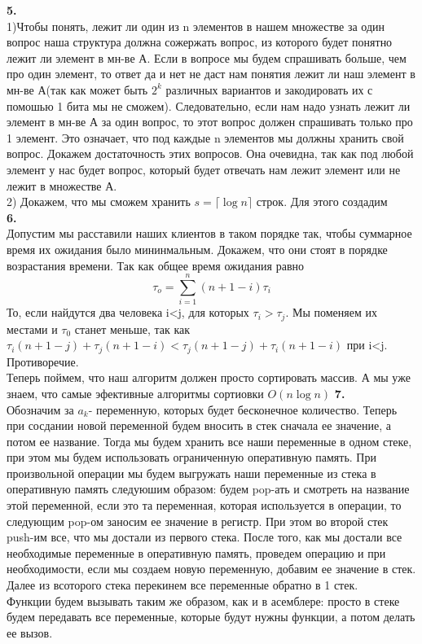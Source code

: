 \documentclass[a4paper,12pt]{article}
\begin{document}
\textbf{5.}\\
1)Чтобы понять, лежит ли один из n элементов в нашем множестве за один вопрос наша структура должна сожержать вопрос, из которого будет понятно лежит ли элемент в мн-ве А.  Если в вопросе мы будем спрашивать больше, чем про один элемент, то ответ да и нет не даст нам понятия лежит ли наш элемент в мн-ве А(так как может быть $2^k$ различных вариантов и закодировать их с помошью 1 бита мы не сможем). Следовательно, если нам надо узнать лежит ли элемент в мн-ве А за один вопрос, то этот вопрос должен спрашивать только про 1 элемент. Это означает, что под каждые n элементов мы должны хранить свой вопрос. Докажем достаточность этих вопросов. Она очевидна, так как под любой элемент у нас будет вопрос, который будет отвечать нам лежит элемент или не лежит в множестве А.\\
2) Докажем, что мы сможем хранить $s=\lceil \log n \rceil $ строк. Для этого создадим \\
\textbf{6.}\\
Допустим мы расставили наших клиентов в таком порядке так, чтобы суммарное время их ожидания было мининмальным. Докажем, что они стоят в порядке возрастания времени. Так как общее время ожидания равно
\[\tau_o=\sum_{i=1}^n (n+1-i)\tau_i\]
То, если найдутся два человека i<j, для которых $\tau_i>\tau_j$. Мы поменяем их местами и $\tau_0$ станет меньше, так как $\tau_i(n+1-j)+\tau_j(n+1-i)<\tau_j(n+1-j)+\tau_i(n+1-i)$
при i<j. Противоречие.\\
Теперь поймем, что наш алгоритм должен просто сортировать массив. А мы уже знаем, что самые эфективные алгоритмы сортиовки $O(n\log n)$
\textbf{7.}\\
Обозначим за $a_k$- переменную, которых будет бесконечное количество. Теперь при сосдании новой переменной будем вносить в стек сначала ее значение, а потом ее название. Тогда мы будем хранить все наши переменные в одном стеке, при этом мы будем использовать ограниченную оперативную память. При произвольной операции мы будем выгружать наши переменные из стека в оперативную память следуюшим образом: будем pop-ать и смотреть на название этой переменной, если это та переменная, которая используется в операции, то следующим pop-ом заносим ее значение в регистр. При этом во второй стек push-им все, что мы достали из первого стека. После того, как мы достали все необходимые переменные в оперативную память, проведем операцию и при необходимости, если мы создаем новую переменную, добавим ее значение в стек. Далее из всоторого стека перекинем все переменные обратно в 1 стек.\\
Функции будем вызывать таким же образом, как и в асемблере: просто в стеке будем передавать все переменные, которые будут нужны функции, а потом делать ее вызов. 
\end{document}
